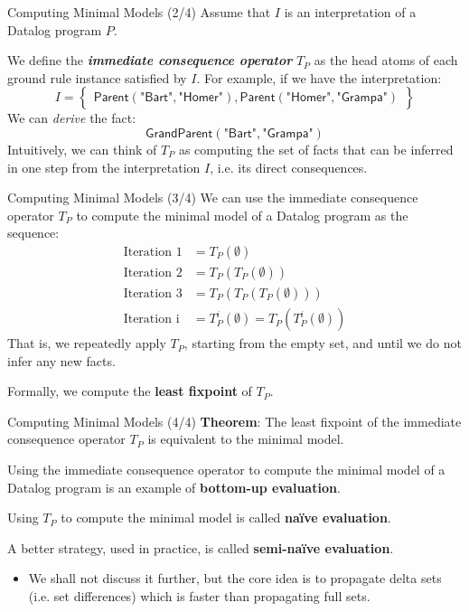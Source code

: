 \begin{frame}{Computing Minimal Models (2/4)}
Assume that $I$ is an interpretation of a Datalog program $P$.

We define the \textbf{\emph{immediate consequence operator}} $T_P$ as the head
atoms of each ground rule instance satisfied by $I$. For example, if we have the
interpretation:
$$
I = \left\{
\begin{array}{l}
\textsf{Parent}(\textsf{"Bart"}, \textsf{"Homer"}), \textsf{Parent}(\textsf{"Homer"}, \textsf{"Grampa"})
\end{array}\right\}
$$
We can \emph{derive} the fact:
$$
\textsf{GrandParent}(\textsf{"Bart"}, \textsf{"Grampa"})
$$
Intuitively, we can think of $T_P$ as computing the set of facts that can be
inferred in one step from the interpretation $I$, i.e. its direct consequences.
\end{frame}

\begin{frame}{Computing Minimal Models (3/4)}
We can use the immediate consequence operator $T_P$ to compute the minimal model
of a Datalog program as the sequence:
%
\begin{align*}
\text{Iteration 1} &= T_P(\emptyset) \\
\text{Iteration 2} &= T_P(T_P(\emptyset)) \\
\text{Iteration 3} &= T_P(T_P(T_P(\emptyset))) \\ 
\text{Iteration i} &= T_P^i(\emptyset) = T_P(T_P^i(\emptyset))
\end{align*}
%
That is, we repeatedly apply $T_P$, starting from the empty set, and until we do
not infer any new facts. 

Formally, we compute the \textbf{least fixpoint} of $T_P$.
\end{frame}

\begin{frame}{Computing Minimal Models (4/4)}
\textbf{Theorem}: The least fixpoint of the immediate consequence operator $T_P$
is equivalent to the minimal model.

\pause

Using the immediate consequence operator to compute the minimal model of a
Datalog program is an example of \textbf{bottom-up evaluation}.

\pause

Using $T_P$ to compute the minimal model is called \textbf{na\"ive
evaluation}.

\pause

A better strategy, used in practice, is called \textbf{semi-na\"ive evaluation}.
\begin{itemize}
    \item We shall not discuss it further, but the core idea is to propagate
    delta sets (i.e. set differences) which is faster than propagating full sets.
\end{itemize}
\end{frame}

